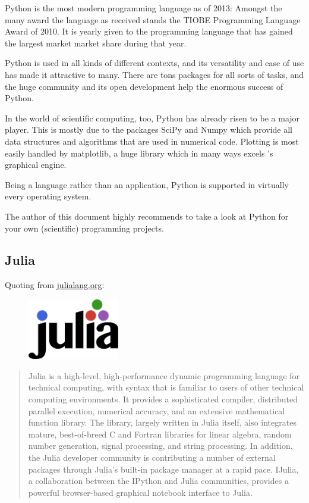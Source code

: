Python is the most modern programming language as of 2013: Amongst the many
award the language as received stands the TIOBE Programming Language Award of
2010. It is yearly given to the programming language that has gained the
largest market market share during that year.

Python is used in all kinds of different contexts, and its versatility and
ease of use has made it attractive to many. There are tons packages for all
sorts of tasks, and the huge community and its open development help the
enormous success of Python.

In the world of scientific computing, too, Python has already risen to be a
major player. This is mostly due to the packages SciPy and Numpy which provide
all data structures and algorithms that are used in numerical code. Plotting
is most easily handled by matplotlib, a huge library which in many ways excels
\matlab{}'s graphical engine.

Being a language rather than an application, Python is supported in virtually
every operating system.

The author of this document highly recommends to take a look at Python for
your own (scientific) programming projects.


\subsection{Julia}

Quoting from \url{julialang.org}:\\
\begin{figure}
  \centering
  \includegraphics[width=4cm]{figures/julia-logo-color.pdf}
\end{figure}
\begin{quote}
Julia is a high-level, high-performance dynamic programming language for
technical computing, with syntax that is familiar to users of other technical
computing environments. It provides a sophisticated compiler, distributed
parallel execution, numerical accuracy, and an extensive mathematical function
library. The library, largely written in Julia itself, also integrates mature,
best-of-breed C and Fortran libraries for linear algebra, random number
generation, signal processing, and string processing. In addition, the Julia
developer community is contributing a number of external packages through
Julia’s built-in package manager at a rapid pace. IJulia, a collaboration
between the IPython and Julia communities, provides a powerful browser-based
graphical notebook interface to Julia.
\end{quote}


